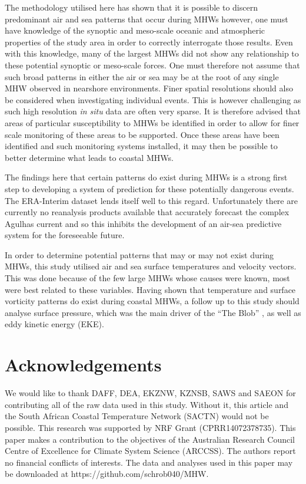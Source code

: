 \documentclass[a4paper,10pt,review]{elsarticle}
\begin{document}
The methodology utilised here has shown that it is possible to discern predominant air and sea patterns that occur during MHWs however, one must have knowledge of the synoptic and meso-scale oceanic and atmospheric properties of the study area in order to correctly interrogate those results. Even with this knowledge, many of the largest MHWs did not show any relationship to these potential synoptic or meso-scale forces. One must therefore not assume that such broad patterns in either the air or sea may be at the root of any single MHW observed in nearshore environments. Finer spatial resolutions should also be considered when investigating individual events. This is however challenging as such high resolution \emph{in situ} data are often very sparse. It is therefore advised that areas of particular susceptibility to MHWs be identified in order to allow for finer scale monitoring of these areas to be supported. Once these areas have been identified and such monitoring systems installed, it may then be possible to better determine what leads to coastal MHWs.

The findings here that certain patterns do exist during MHWs is a strong first step to developing a system of prediction for these potentially dangerous events. The ERA-Interim dataset lends itself well to this regard. Unfortunately there are currently no reanalysis products available that accurately forecast the complex Agulhas current and so this inhibits the development of an air-sea predictive system for the foreseeable future.

In order to determine potential patterns that may or may not exist during MHWs, this study utilised air and sea surface temperatures and velocity vectors. This was done because of the few large MHWs whose causes were known, \citep[e.g.][]{Garrabou2009, Feng2013, Pearce2013, Benthuysen2014, Chen2015a, Oliver2017} most were best related to these variables. Having shown that temperature and surface vorticity patterns do exist during coastal MHWs, a follow up to this study should analyse surface pressure, which was the main driver of the ``The Blob'' \citep{Bond2015a}, as well as eddy kinetic energy (EKE).

\section*{Acknowledgements}
We would like to thank DAFF, DEA, EKZNW, KZNSB, SAWS and SAEON for contributing all of the raw data used in this study. Without it, this article and the South African Coastal Temperature Network (SACTN) would not be possible. This research was supported by NRF Grant (CPRR14072378735). This paper makes a contribution to the objectives of the Australian Research Council Centre of Excellence for Climate System Science (ARCCSS). The authors report no financial conflicts of interests. The data and analyses used in this paper may be downloaded at https://github.com/schrob040/MHW.
\end{document}

